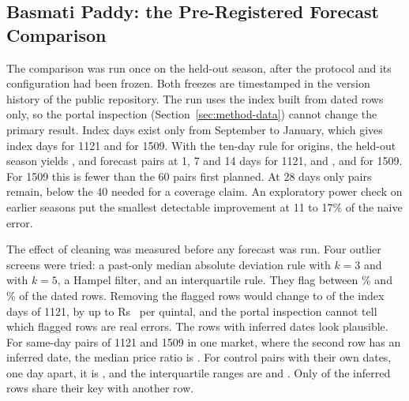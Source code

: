 \subsection{Basmati Paddy: the Pre-Registered Forecast Comparison}
\label{sec:results-basmati}

The comparison was run once on the held-out season, after the protocol and its configuration had been frozen. Both freezes are
timestamped in the version history of the public repository. The run uses the index built from dated rows only, so the portal
inspection (Section~\ref{sec:method-data}) cannot change the primary result. Index days exist only from September to January, which
gives  index days for 1121 and  for 1509. With the ten-day rule for origins, the
held-out season yields ,  and  forecast pairs at 1, 7 and 14 days for 1121, and
,  and  for 1509. For 1509 this is fewer than the 60 pairs first planned. At
28 days only  pairs remain, below the 40 needed for a coverage claim. An exploratory power check on earlier seasons
put the smallest detectable improvement at 11 to 17\% of the naive error.

The effect of cleaning was measured before any forecast was run. Four outlier screens were tried: a past-only median absolute
deviation rule with $k=3$ and with $k=5$, a Hampel filter, and an interquartile rule. They flag between \%
and \% of the dated rows. Removing the flagged rows would change  to
 of the  index days of 1121, by up to Rs~ per quintal,
and the portal inspection cannot tell which flagged rows are real errors. The rows with inferred dates look plausible. For
 same-day pairs of 1121 and 1509 in one market, where the second row has an inferred date, the median price ratio is
. For  control pairs with their own dates, one day apart, it is , and the
interquartile ranges are  and . Only  of the  inferred rows share their key
with another row.

